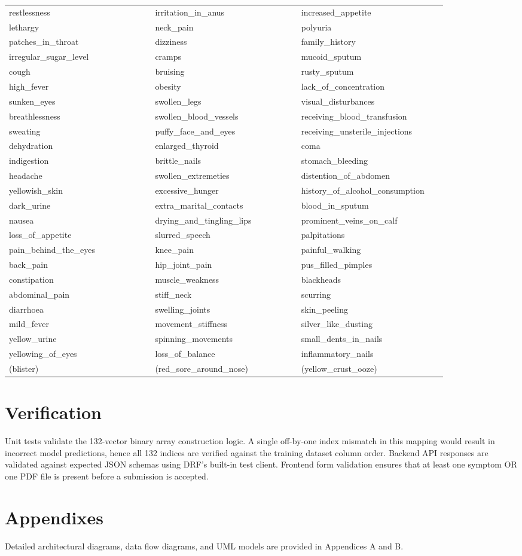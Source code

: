 \begin{longtable}{|p{0.3\linewidth}|p{0.3\linewidth}|p{0.3\linewidth}|}
restlessness & irritation\_in\_anus & increased\_appetite \\
lethargy & neck\_pain & polyuria \\
patches\_in\_throat & dizziness & family\_history \\
irregular\_sugar\_level & cramps & mucoid\_sputum \\
cough & bruising & rusty\_sputum \\
high\_fever & obesity & lack\_of\_concentration \\
sunken\_eyes & swollen\_legs & visual\_disturbances \\
breathlessness & swollen\_blood\_vessels & receiving\_blood\_transfusion \\
sweating & puffy\_face\_and\_eyes & receiving\_unsterile\_injections \\
dehydration & enlarged\_thyroid & coma \\
indigestion & brittle\_nails & stomach\_bleeding \\
headache & swollen\_extremeties & distention\_of\_abdomen \\
yellowish\_skin & excessive\_hunger & history\_of\_alcohol\_consumption \\
dark\_urine & extra\_marital\_contacts & blood\_in\_sputum \\
nausea & drying\_and\_tingling\_lips & prominent\_veins\_on\_calf \\
loss\_of\_appetite & slurred\_speech & palpitations \\
pain\_behind\_the\_eyes & knee\_pain & painful\_walking \\
back\_pain & hip\_joint\_pain & pus\_filled\_pimples \\
constipation & muscle\_weakness & blackheads \\
abdominal\_pain & stiff\_neck & scurring \\
diarrhoea & swelling\_joints & skin\_peeling \\
mild\_fever & movement\_stiffness & silver\_like\_dusting \\
yellow\_urine & spinning\_movements & small\_dents\_in\_nails \\
yellowing\_of\_eyes & loss\_of\_balance & inflammatory\_nails \\
(blister) & (red\_sore\_around\_nose) & (yellow\_crust\_ooze) \\ \hline
\end{longtable}

\section{Verification}
Unit tests validate the 132-vector binary array construction logic. A single off-by-one index mismatch in this mapping would result in incorrect model predictions, hence all 132 indices are verified against the training dataset column order. Backend API responses are validated against expected JSON schemas using DRF's built-in test client. Frontend form validation ensures that at least one symptom OR one PDF file is present before a submission is accepted.

\section{Appendixes}
Detailed architectural diagrams, data flow diagrams, and UML models are provided in Appendices A and B.
